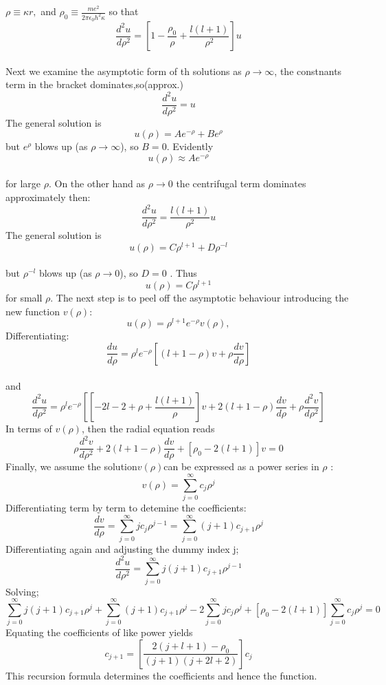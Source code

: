 \documentclass[12pt]{article}
\begin{document}
$\rho \equiv \kappa r, $ and $   \rho_0 \equiv \frac{me^2}{2\pi\epsilon_0h^2\kappa}$ 
so that
$$ \frac{d^2u}{d\rho^2}=\left[1-\frac{\rho_0}{\rho} + \frac{l(l+1)}{\rho^2}\right]u$$\\
Next we examine the asymptotic form of th solutions as $ \rho \rightarrow \infty$, the constnants term in the bracket dominates,so(approx.)\\
$$ \frac{d^2u}{d\rho^2}=u$$ 
The general solution is
$$u(\rho) =Ae^{-\rho} + Be^\rho$$ 
but $e^\rho$ blows up (as $\rho\rightarrow \infty$), so $B=0$. Evidently \\
$$u(\rho)\approx Ae^{-\rho}$$\\
for large $\rho$. On the other hand as $\rho \rightarrow 0$ the centrifugal term dominates approximately then:\\
$$ \frac{d^2u}{d\rho^2}= \frac{l(l+1)}{\rho^2}u$$ 
The general solution is 
$$u(\rho)=C\rho^{l+1}+ D\rho^{-l}$$\\ 
but $\rho^{-l}$ blows up (as $\rho \rightarrow 0$), so $D=0$ . Thus \\ 
$$u(\rho)=C\rho^{l+1}$$
for small $\rho$.  
The next step is to peel off the asymptotic behaviour introducing the new function $v(\rho) $:
$$u(\rho)=\rho^{l+1}e^{-\rho}v(\rho),$$
Differentiating:
$$ \frac{du}{d\rho}=\rho^l e^{-\rho}\left[(l+1-\rho)v + \rho\frac{dv}{d\rho}\right]$$ \\ 
and 
$$\frac{d^2u}{d\rho^2}=\rho^l e^{-\rho}\left[[-2l-2+\rho+\frac{l(l+1)}{\rho}]v +2( l+1-\rho) \frac{dv}{d\rho}+\rho\frac{d^2v}{d\rho^2}\right]$$ 
In terms of $v(\rho)$, then the radial equation reads
$$\rho\frac{d^2v}{d\rho^2}+ 2(l+1-\rho)\frac{dv}{d\rho}+[\rho_0-2(l+1)]v=0$$
Finally, we assume the solution$ v(\rho) $can be expressed as a power series in $\rho$ :
$$v(\rho)=\sum_{j=0}^{\infty}c_j\rho^j$$
Differentiating term by term to detemine the coefficients: 
$$\frac{dv}{d\rho} = \sum_{j=0}^{\infty}j c_j\rho^{j-1} = \sum_{j=0}^{\infty}(j+1)c_{j+1}\rho^j$$ 
Differentiating again and adjusting the dummy index j; 
$$\frac{d^2u}{d\rho^2}=\sum_{j=0}^{\infty}j(j+1)c_{j+1}\rho^{j-1}$$
Solving;
$$\sum_{j=0}^{\infty}j(j+1)c_{j+1}\rho^j+\sum_{j=0}^{\infty}(j+1)c_{j+1}\rho^j-2\sum_{j=0}^{\infty}jc_{j}\rho^j+ [\rho_0-2(l+1)]\sum_{j=0}^{\infty}c_j\rho^j=0$$ 
Equating the coefficients of like power yields 
$$c_{j+1}=\left[\frac{2(j+l+1)-\rho_0}{(j+1)(j+2l+2)}\right]c_j$$ 
This recursion formula determines the coefficients and hence the function. \\ \\%
\end{document}
